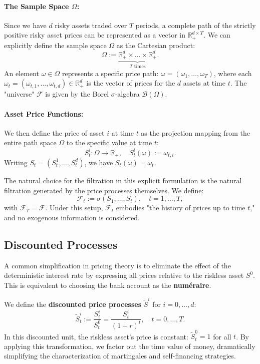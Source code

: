 \paragraph{The Sample Space $\Omega$:}
Since we have $d$ risky assets traded over $T$ periods, a complete path of the strictly positive risky asset prices can be represented as a vector in $\mathbb{R}_+^{d \times T}$. We can explicitly define the sample space $\Omega$ as the Cartesian product:
$$
\Omega := \underbrace{\mathbb{R}_+^d \times \dots \times \mathbb{R}_+^d}_{T \text{ times}}.
$$
An element $\omega \in \Omega$ represents a specific price path: $\omega = (\omega_1, \dots, \omega_T)$, where each $\omega_t = (\omega_{t,1}, \dots, \omega_{t,d}) \in \mathbb{R}_+^d$ is the vector of prices for the $d$ assets at time $t$. The "universe" $\mathcal{F}$ is given by the Borel $\sigma$-algebra $\mathcal{B}(\Omega)$.

\paragraph{Asset Price Functions:}
We then define the price of asset $i$ at time $t$ as the projection mapping from the entire path space $\Omega$ to the specific value at time $t$:
$$
S_t^i : \Omega \to \mathbb{R}_+, \quad S_t^i(\omega) := \omega_{t,i}.
$$
Writing $S_t = (S_t^1, \dots, S_t^d)$, we have $S_t(\omega) = \omega_t$.

The natural choice for the filtration in this explicit formulation is the natural filtration generated by the price processes themselves. We define:
$$
\mathcal{F}_t := \sigma(S_1, \dots, S_t), \quad t = 1, \dots, T,
$$
with $\mathcal{F}_T = \mathcal{F}$. Under this setup, $\mathcal{F}_t$ embodies "the history of prices up to time $t$," and no exogenous information is considered.

\subsection{Discounted Processes}

A common simplification in pricing theory is to eliminate the effect of the deterministic interest rate by expressing all prices relative to the riskless asset $S^0$. This is equivalent to choosing the bank account as the \textbf{numéraire}.

We define the \textbf{discounted price processes} $\tilde{S}^i$ for $i = 0, \dots, d$:
$$
\tilde{S}_t^i := \frac{S_t^i}{S_t^0} = \frac{S_t^i}{(1+r)^t}, \quad t=0, \dots, T.
$$
In this discounted unit, the riskless asset's price is constant: $\tilde{S}_t^0 = 1$ for all $t$. By applying this transformation, we factor out the time value of money, dramatically simplifying the characterization of martingales and self-financing strategies.

